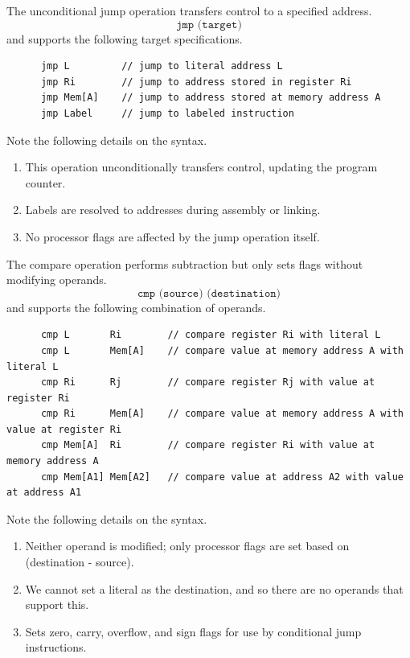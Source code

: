   \begin{definition}
    \label{def:unconditional-jumps}
    The unconditional jump operation transfers control to a specified address.
    \begin{equation}
      \texttt{jmp (target)}
    \end{equation}
    and supports the following target specifications.
    \begin{lstlisting}
      jmp L         // jump to literal address L
      jmp Ri        // jump to address stored in register Ri
      jmp Mem[A]    // jump to address stored at memory address A
      jmp Label     // jump to labeled instruction
    \end{lstlisting}
    Note the following details on the syntax.
    \begin{enumerate}
      \item This operation unconditionally transfers control, updating the program counter.
      \item Labels are resolved to addresses during assembly or linking.
      \item No processor flags are affected by the jump operation itself.
    \end{enumerate}
  \end{definition}

  \begin{definition}[Compare]
    \label{def:compare}
    The compare operation performs subtraction but only sets flags without modifying operands.
    \begin{equation}
      \texttt{cmp (source) (destination)}
    \end{equation}
    and supports the following combination of operands.
    \begin{lstlisting}
      cmp L       Ri        // compare register Ri with literal L
      cmp L       Mem[A]    // compare value at memory address A with literal L
      cmp Ri      Rj        // compare register Rj with value at register Ri
      cmp Ri      Mem[A]    // compare value at memory address A with value at register Ri
      cmp Mem[A]  Ri        // compare register Ri with value at memory address A
      cmp Mem[A1] Mem[A2]   // compare value at address A2 with value at address A1
    \end{lstlisting}
    Note the following details on the syntax.
    \begin{enumerate}
      \item Neither operand is modified; only processor flags are set based on (destination - source).
      \item We cannot set a literal as the destination, and so there are no operands that support this.
      \item Sets zero, carry, overflow, and sign flags for use by conditional jump instructions.
    \end{enumerate}
  \end{definition}

